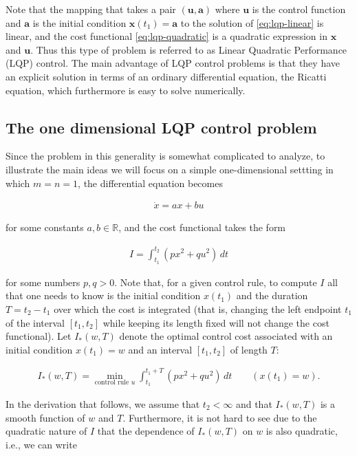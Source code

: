 \documentclass[11pt]{report}
\theoremstyle{plain}
\theoremstyle{definition}
\begin{document}
Note that the mapping that takes a pair
$(\mathbf{u},\mathbf{a})$ where $\mathbf{u}$ is the
control function and $\mathbf{a}$ is the initial
condition $\mathbf{x}(t_1)=\mathbf{a}$ to the solution
of \eqref{eq:lqp-linear} is linear, and the cost
functional \eqref{eq:lqp-quadratic} is a quadratic
expression in $\mathbf{x}$ and $\mathbf{u}$. Thus this
type of problem is referred to as Linear Quadratic
Performance (LQP) control. The main advantage of LQP
control problems is that they have an explicit
solution in terms of an ordinary differential
equation, the Ricatti equation, which furthermore is
easy to solve numerically.

\subsection{The one dimensional LQP control problem}

Since the problem in this generality is somewhat
complicated to analyze, to illustrate the main ideas
we will focus on a simple one-dimensional settting in
which $m=n=1$, the differential equation becomes

\begin{align*}
\dot{x} = ax+bu
\end{align*}

\noindent for some constants $a,b\in\mathbb{R}$, and the cost
functional takes the form

\begin{align*}
I = \int_{t_1}^{t_2} (px^2+qu^2)\,dt
\end{align*}

\noindent for some numbers $p,q>0$. Note that, for a given
control rule, to compute $I$ all that one needs to
know is the initial condition $x(t_1)$ and the
duration $T=t_2-t_1$ over which the cost is integrated
(that is, changing the left endpoint $t_1$ of the
interval $[t_1,t_2]$ while keeping its length fixed
will not change the cost functional). Let $I_*(w,T)$
denote the optimal control cost associated with an
initial condition $x(t_1)=w$ and an interval
$[t_1,t_2]$ of length $T$:

\begin{align*}
I_*(w,T) = \min_{\textrm{control rule $u$}} \int_{t_1}^{t_1+T} (p x^2+qu^2)\,dt
 \qquad (x(t_1)=w).
\end{align*}

\noindent In the derivation that follows, we assume that
$t_2<\infty$ and that $I_*(w,T)$ is a smooth function
of $w$ and $T$. Furthermore, it is not hard to see due
to the quadratic nature of $I$ that the dependence of
$I_*(w,T)$ on $w$ is also quadratic, i.e., we can
write
\end{document}
